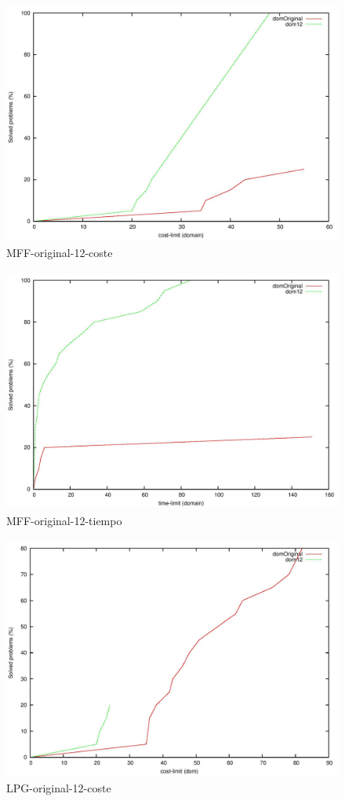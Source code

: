 \documentclass{article}
\begin{document}
    
    \begin{figure}[H]
        \centering
        \includegraphics[width=12cm, height=8cm]{mff-or-12-cost}
        \caption{MFF-original-12-coste}
    \end{figure}
    
    \begin{figure}[H]
        \centering
        \includegraphics[width=12cm, height=8cm]{mff-or-12-time}
        \caption{MFF-original-12-tiempo}
    \end{figure}
    
    \begin{figure}[H]
        \centering
        \includegraphics[width=12cm, height=8cm]{lpg-or-12-cost}
        \caption{LPG-original-12-coste}
    \end{figure}
    
\end{document}
